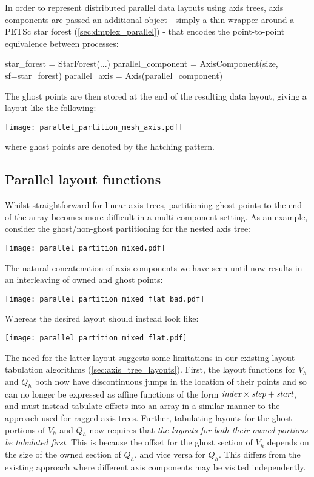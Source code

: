 \documentclass[thesis]{subfiles}
\begin{document}
In order to represent distributed parallel data layouts using axis trees, axis components are passed an additional  object - simply a thin wrapper around a PETSc star forest (\cref{sec:dmplex_parallel}) - that encodes the point-to-point equivalence between processes:
\begin{pyinline}
  star_forest = StarForest(...)
  parallel_component = AxisComponent(size, sf=star_forest)
  parallel_axis = Axis(parallel_component)
\end{pyinline}
The ghost points are then stored at the end of the resulting data layout, giving a layout like the following:
\begin{center}
  \texttt{[image: parallel\_partition\_mesh\_axis.pdf]}
\end{center}
where ghost points are denoted by the hatching pattern.

\subsection{Parallel layout functions}

Whilst straightforward for linear axis trees, partitioning ghost points to the end of the array becomes more difficult in a multi-component setting.
As an example, consider the ghost/non-ghost partitioning for the nested axis tree:
\begin{center}
  \texttt{[image: parallel\_partition\_mixed.pdf]}
\end{center}
The natural concatenation of axis components we have seen until now results in an interleaving of owned and ghost points:
\begin{center}
  \texttt{[image: parallel\_partition\_mixed\_flat\_bad.pdf]}
\end{center}
Whereas the desired layout should instead look like:
\begin{center}
  \texttt{[image: parallel\_partition\_mixed\_flat.pdf]}
\end{center}

The need for the latter layout suggests some limitations in our existing layout tabulation algorithms (\cref{sec:axis_tree_layouts}).
First, the layout functions for $V_h$ and $Q_h$ both now have discontinuous jumps in the location of their points and so can no longer be expressed as affine functions of the form $\textnormal{\it index} \times \textnormal{\it step} + \textnormal{\it start}$, and must instead tabulate offsets into an array in a similar manner to the approach used for ragged axis trees.
Further, tabulating layouts for the ghost portions of $V_h$ and $Q_h$ now requires that \emph{the layouts for both their owned portions be tabulated first}.
This is because the offset for the ghost section of $V_h$ depends on the size of the owned section of $Q_h$, and vice versa for $Q_h$.
This differs from the existing approach where different axis components may be visited independently.
\end{document}
